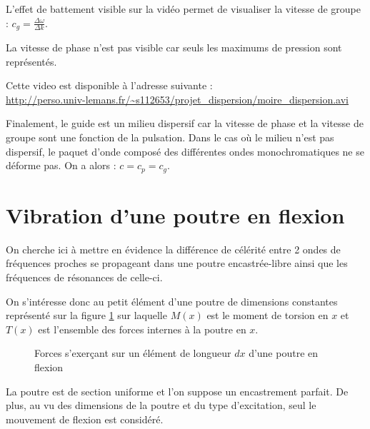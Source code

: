 \documentclass[a4paper,11pt]{report} %
\begin{document}
L'effet de battement visible sur la vidéo permet de visualiser la vitesse de groupe : $c_g = \frac{\Delta \omega}{\Delta k}$.

La vitesse de phase n'est pas visible car seuls les maximums de pression sont représentés.

Cette video est disponible à l'adresse suivante :\\
\url{http://perso.univ-lemans.fr/~s112653/projet_dispersion/moire_dispersion.avi}


\bigskip \bigskip

Finalement, le guide est un milieu dispersif car la vitesse de phase et la vitesse de groupe sont une fonction de la pulsation.
Dans le cas où le milieu n'est pas dispersif, le paquet d'onde composé des différentes ondes monochromatiques ne se déforme pas. On a alors : $c=c_p=c_g$.


\vspace{2cm}




\section{Vibration d'une poutre en flexion}
On cherche ici à mettre en évidence la différence de célérité entre 2 ondes de fréquences proches se propageant dans une poutre encastrée-libre ainsi que les fréquences de résonances de celle-ci.

On s'intéresse donc au petit élément d'une poutre de dimensions constantes représenté sur la figure \ref{poutre_graphic1} sur laquelle $M(x)$ est le moment de torsion en $x$ et $T(x)$ est l'ensemble des forces internes à la poutre en $x$.

\begin{figure}[!h]
\caption{\label{poutre_graphic1} Forces s’exerçant sur un élément de longueur $dx$ d'une poutre en flexion}
\end{figure}

La poutre est de section uniforme et l'on suppose un encastrement parfait. De plus, au vu des dimensions de la poutre et du type d'excitation, seul le mouvement de flexion est considéré.
\end{document}
